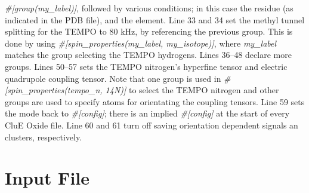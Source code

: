 \documentclass{book}
\begin{document}
\textit{\#[group(my\_label)]}, 
followed by various conditions; 
in this case the residue (as indicated in the PDB file),
and the element.
Line 33 and 34 set the methyl tunnel splitting for the TEMPO to 80 kHz,
by referencing the previous group.
This is done by using 
\textit{\#[spin\_properties(my\_label, my\_isotope)]},
where \textit{my\_label} matches the group selecting the TEMPO
hydrogens.
Lines 36--48 declare more groups.
Lines 50--57 sets the TEMPO nitrogen's hyperfine tensor and 
electric quadrupole coupling tensor.
Note that one group is used in 
\textit{\#[spin\_properties(tempo\_n, 14N)]}
to select the TEMPO nitrogen and other groups are used to specify atoms
for orientating the coupling tensors.
Line 59 sets the mode back to \textit{\#[config]}; there is an implied 
\textit{\#[config]} at the start of every CluE Oxide file.
Line 60 and 61 turn off saving orientation dependent signals an clusters,
respectively.
\section{Input File}
\end{document}
